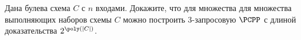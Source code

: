 Дана булева схема $C$ с $n$ входами. Докажите, что для множества для множества выполняющих наборов схемы
$C$ можно построить $3$-запросовую $\PCPP$ с длиной доказательства $2^{\poly(|C|)}$.